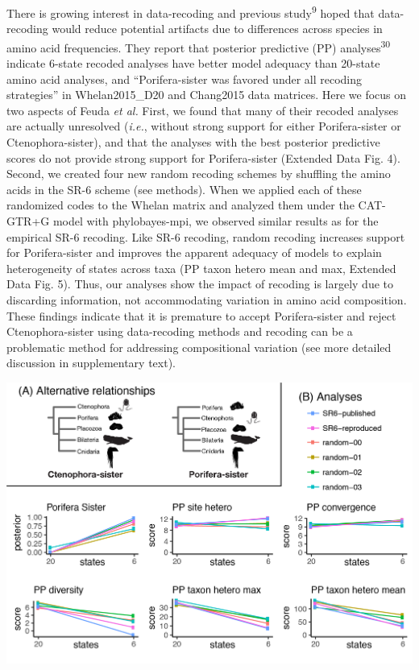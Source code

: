 \documentclass[]{article}
\begin{document}
There is growing interest in data-recoding and previous
study\textsuperscript{9} hoped that data-recoding would reduce potential
artifacts due to differences across species in amino acid frequencies.
They report that posterior predictive (PP) analyses\textsuperscript{30}
indicate 6-state recoded analyses have better model adequacy than
20-state amino acid analyses, and ``Porifera-sister was favored under
all recoding strategies'' in Whelan2015\_D20 and Chang2015 data
matrices. Here we focus on two aspects of Feuda \emph{et al.} First, we
found that many of their recoded analyses are actually unresolved
(\emph{i.e.}, without strong support for either Porifera-sister or
Ctenophora-sister), and that the analyses with the best posterior
predictive scores do not provide strong support for Porifera-sister
(Extended Data Fig. 4). Second, we created four new random recoding
schemes by shuffling the amino acids in the SR-6 scheme (see methods).
When we applied each of these randomized codes to the Whelan matrix and
analyzed them under the CAT-GTR+G model with phylobayes-mpi, we observed
similar results as for the empirical SR-6 recoding. Like SR-6 recoding,
random recoding increases support for Porifera-sister and improves the
apparent adequacy of models to explain heterogeneity of states across
taxa (PP taxon hetero mean and max, Extended Data Fig. 5). Thus, our
analyses show the impact of recoding is largely due to discarding
information, not accommodating variation in amino acid composition.
These findings indicate that it is premature to accept Porifera-sister
and reject Ctenophora-sister using data-recoding methods and recoding
can be a problematic method for addressing compositional variation (see
more detailed discussion in supplementary text).

\includegraphics{figures/Figure_random_rocoding.png}
\end{document}
